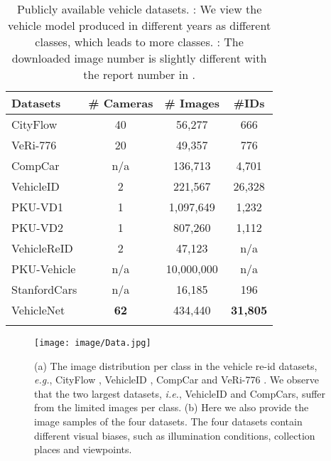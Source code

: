 \documentclass[journal]{IEEEtran}
\def\eg{\emph{e.g.}}
\def\ie{\emph{i.e.}}
\begin{document}
\begin{table}[!t]
\caption{Publicly available vehicle datasets. : We view the vehicle model produced in different years as different classes, which leads to more classes. : The downloaded image number is slightly different with the report number in \cite{liu2016pku}.}
\vspace{-.1in}
\label{table:datasets}
\centering
\setlength{\tabcolsep}{9pt}
\begin{tabular}{l|c|c|c}
\shline
Datasets & \# Cameras & \# Images & \#IDs \\
\hline
CityFlow \cite{tang@cityflow} & 40 & 56,277 & 666 \\
VeRi-776 \cite{liu2016deep} & 20 & 49,357 & 776 \\
CompCar \cite{yang2015large}  & n/a & 136,713 & 4,701 \\
VehicleID \cite{liu2016pku}   & 2 & 221,567 & 26,328\\
PKU-VD1 \cite{yan2017exploiting} & 1 & 1,097,649 & 1,232  \\
PKU-VD2 \cite{yan2017exploiting} & 1 & 807,260 & 1,112  \\
VehicleReID \cite{Zapletal2016} & 2 & 47,123 & n/a \\
PKU-Vehicle \cite{bai2018group} & n/a & 10,000,000 & n/a \\
StanfordCars \cite{KrauseStarkDengFei-Fei_3DRR2013} & n/a & 16,185 & 196\\
\hline
VehicleNet & \textbf{62} & 434,440 & \textbf{31,805} \\
\shline
\end{tabular}
\end{table}

\begin{figure}[t]
\begin{center}
\texttt{[image: image/Data.jpg]}
\end{center}
\vspace{-.2in}
   \caption{(a) The image distribution per class in the vehicle re-id datasets, \eg, CityFlow \cite{tang@cityflow}, VehicleID \cite{liu2016pku} , CompCar \cite{yang2015large} and VeRi-776 \cite{liu2016deep}. We observe that the two largest datasets, \ie, VehicleID and CompCars, suffer from the limited images per class. (b) Here we also provide the image samples of the four datasets. The four datasets contain different visual biases, such as  illumination conditions, collection places and viewpoints. }
\label{fig:data}
\vspace{-.1in}
\end{figure}
\end{document}
